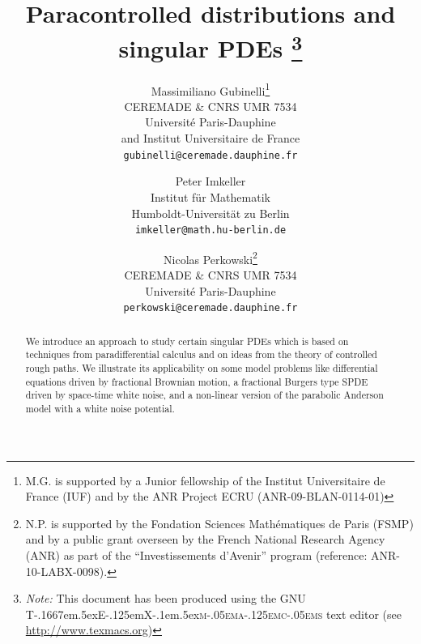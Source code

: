 \documentclass[11pt,a4paper]{article}
\newcommand{\TeXmacs}{T\kern-.1667em\lower.5ex\hbox{E}\kern-.125emX\kern-.1em\lower.5ex\hbox{\textsc{m\kern-.05ema\kern-.125emc\kern-.05ems}}}
\newcommand{\tmSep}{; }
\newcommand{\tmaffiliation}[1]{\thanks{\textit{Affiliation:} #1}}
\newcommand{\tmnote}[1]{\thanks{\textit{Note:} #1}}
\newcommand{\withTeXmacstext}{This document has been produced using the GNU {\TeXmacs} text editor (see \url{http://www.texmacs.org})}
\theoremstyle{remark}
\begin{document}
\title{Paracontrolled distributions and singular PDEs \tmnote{{\withTeXmacstext}}}

\author{
  Massimiliano Gubinelli\footnote{M.G. is supported by a Junior fellowship of the Institut Universitaire de France (IUF) and  by the ANR Project
ECRU (ANR-09-BLAN-0114-01)}
 \\ CEREMADE \& CNRS UMR 7534 \\ Universit{\'e} Paris-Dauphine\\
 and Institut Universitaire de France \\
  \texttt{gubinelli@ceremade.dauphine.fr}
  \and
  Peter Imkeller \\ Institut f\"ur Mathematik \\ Humboldt-Universit\"at zu Berlin\\
  \texttt{imkeller@math.hu-berlin.de}
  \and
  Nicolas Perkowski\footnote{N.P. is supported by the Fondation Sciences Math\'ematiques de Paris (FSMP) and by a public grant overseen by the French National Research Agency (ANR) as part of the ``Investissements d'Avenir'' program (reference: ANR-10-LABX-0098).}
 \\  CEREMADE \& CNRS UMR 7534  \\ Universit{\'e} Paris-Dauphine\\
  \texttt{perkowski@ceremade.dauphine.fr}
}






\maketitle

\begin{abstract}
   We introduce an approach to study certain singular PDEs which is based on  techniques from paradifferential calculus and on ideas from the theory of controlled rough paths. We illustrate its applicability on some model problems like differential equations driven by fractional Brownian motion, a fractional Burgers type SPDE driven by space-time white noise, and a non-linear version of the parabolic Anderson model with a white noise potential.
\end{abstract}
\end{document}
